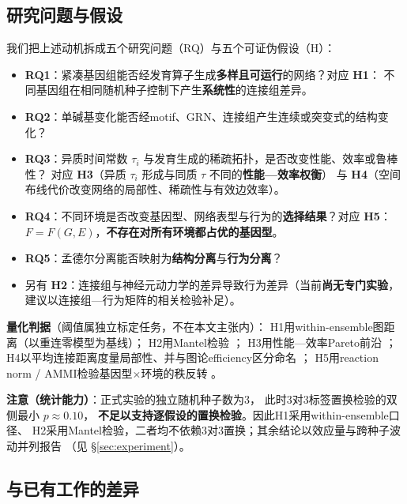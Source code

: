 \subsection{研究问题与假设}\label{sec:rq}

我们把上述动机拆成五个研究问题（RQ）与五个可证伪假设（H）：

\begin{itemize}
  \item \textbf{RQ1}：紧凑基因组能否经发育算子生成\textbf{多样且可运行}的网络？\quad 对应 \textbf{H1}：
        不同基因组在相同随机种子控制下产生\textbf{系统性}的连接组差异。
  \item \textbf{RQ2}：单碱基变化能否经motif、GRN、连接组产生连续或突变式的结构变化？
  \item \textbf{RQ3}：异质时间常数 $\tau_i$ 与发育生成的稀疏拓扑，是否改变性能、效率或鲁棒性？
        \quad 对应 \textbf{H3}（异质 $\tau_i$ 形成与同质 $\tau$ 不同的\textbf{性能—效率权衡}）
        与 \textbf{H4}（空间布线代价改变网络的局部性、稀疏性与有效边效率）。
  \item \textbf{RQ4}：不同环境是否改变基因型、网络表型与行为的\textbf{选择结果}？\quad 对应 \textbf{H5}：
        $F=F(G,E)$，\textbf{不存在对所有环境都占优的基因型}。
  \item \textbf{RQ5}：孟德尔分离能否映射为\textbf{结构分离}与\textbf{行为分离}？
  \item 另有 \textbf{H2}：连接组与神经元动力学的差异导致行为差异（当前\textbf{尚无专门实验}，
        建议以连接组—行为矩阵的相关检验补足）。
\end{itemize}

\textbf{量化判据}（阈值属独立标定任务，不在本文主张内）：
H1用within-ensemble图距离（以重连零模型为基线）\citep{bib20_hartle2020}；
H2用Mantel检验 \citep{bib21_smouse1986}；
H3用性能—效率Pareto前沿 \citep{bib23_deb2002}；
H4以平均连接距离度量局部性、并与图论efficiency区分命名 \citep{bib22_latora2001}；
H5用reaction norm / AMMI检验基因型$\times$环境的秩反转
\citep{bib24_via1985,bib25_malosetti2013}。

\textbf{注意（统计能力）}：正式实验的独立随机种子数为3，
此时3对3标签置换检验的双侧最小 $p\approx0.10$，
\textbf{不足以支持逐假设的置换检验}。因此H1采用within-ensemble口径、
H2采用Mantel检验，二者均不依赖3对3置换；其余结论以效应量与跨种子波动并列报告
（见 \S\ref{sec:experiment}）。

\subsection{与已有工作的差异}\label{sec:related}

